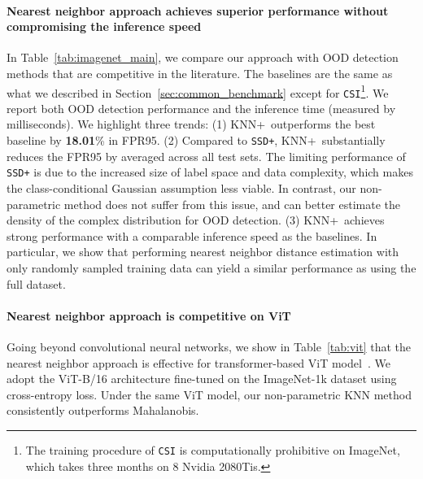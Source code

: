 \documentclass[nohyperref]{article}
\newcommand{\methodplus}{{KNN+}}
\theoremstyle{plain}
\theoremstyle{definition}
\theoremstyle{remark}
\begin{document}
\paragraph{Nearest neighbor approach achieves superior performance without compromising the inference speed} In Table~\ref{tab:imagenet_main}, we compare our approach with OOD detection methods that are competitive in the literature. The baselines are the same as what we described in Section~\ref{sec:common_benchmark} except for \texttt{CSI}\footnote{The training procedure of \texttt{CSI} is computationally  prohibitive on ImageNet, which takes three months on 8 Nvidia 2080Tis.}. We report both  OOD detection performance and the inference time (measured by milliseconds). We highlight three trends: (1) \methodplus~outperforms the best baseline by \textbf{18.01}\% in FPR95. (2) Compared to \texttt{SSD+}, \methodplus~substantially reduces the FPR95 by  averaged across all test sets. The limiting performance of \texttt{SSD+} is due to the increased size of label space and data complexity, which makes the class-conditional Gaussian assumption less viable. In contrast, our non-parametric method does not suffer from this issue, and can better estimate the density of the complex distribution for OOD detection. (3) \methodplus~achieves strong performance with a comparable inference speed as the baselines. In particular, we show that performing nearest neighbor distance estimation with only  randomly sampled training data can yield a similar performance as using the full dataset. 




\paragraph{Nearest neighbor approach is competitive on ViT} Going beyond convolutional neural networks, we show in Table~\ref{tab:vit} that the nearest neighbor approach is effective for transformer-based  ViT model~\citep{dosovitskiy2020image}. We adopt the ViT-B/16 architecture fine-tuned on the ImageNet-1k dataset using cross-entropy loss. Under the same ViT model, our non-parametric KNN method consistently outperforms Mahalanobis. 

\begin{table*}[h]
\centering
\caption{Performance comparison (FPR95) on ViT-B/16 model fine-tuned on ImageNet-1k.}
\label{tab:vit}
\end{table*}
\end{document}
